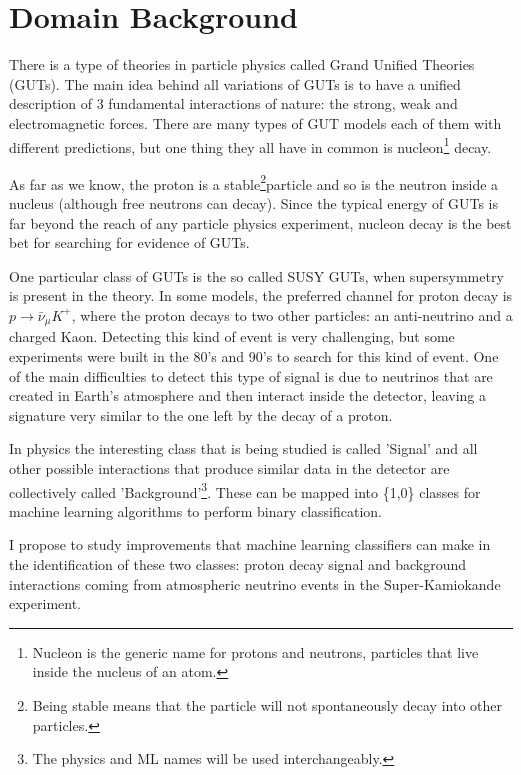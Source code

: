 
\section{Domain Background} \label{Domain}
There is a type of theories in particle physics called Grand Unified Theories (GUTs). The main idea behind all variations of GUTs is to have a unified description of 3 fundamental interactions of nature: the strong, weak and electromagnetic forces. There are many types of GUT models \cite{GUTs} each of them with different predictions, but one thing they all have in common is nucleon\footnote{Nucleon is the generic name for protons and neutrons, particles that live inside the nucleus of an atom.} decay.

As far as we know, the proton is a stable\footnote{Being stable means that the particle will not spontaneously decay into other particles.}particle and so is the neutron inside a nucleus (although free neutrons can decay). Since the typical energy of GUTs is far beyond the reach of any particle physics experiment, nucleon decay is the best bet for searching for evidence of GUTs.

One particular class of GUTs is the so called SUSY GUTs, when supersymmetry is present in the theory. In some models, the preferred channel for proton decay is $p\rightarrow \bar{\nu}_{\mu}K^{+}$, where the proton decays to two other particles: an anti-neutrino and a charged Kaon. Detecting this kind of event is very challenging, but some experiments were built in the 80's and 90's to search for this kind of event. One of the main difficulties to detect this type of signal is due to neutrinos that are created in Earth's atmosphere and then interact inside the detector, leaving a signature very similar to the one left by the decay of a proton.

In physics the interesting class that is being studied is called 'Signal' and all other possible interactions that produce similar data in the detector are collectively called 'Background'\footnote{The physics and ML names will be used interchangeably.}. These can be mapped into \{1,0\} classes for machine learning algorithms to perform binary classification.

I propose to study improvements that machine learning classifiers can make in the identification of these two classes: proton decay signal and background interactions coming from atmospheric neutrino events in the Super-Kamiokande experiment.